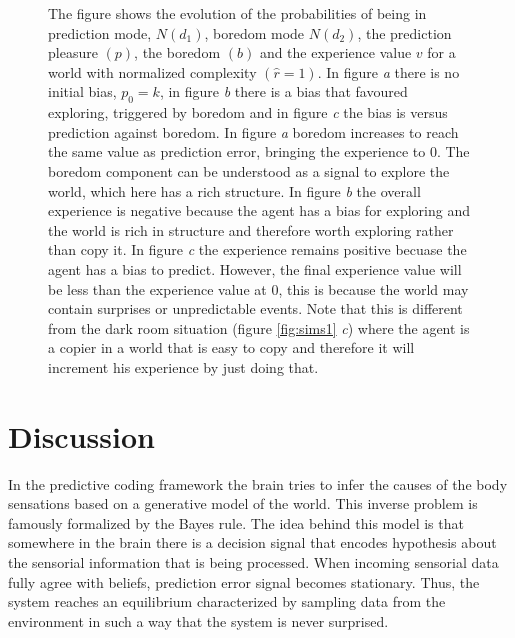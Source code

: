 \documentclass[11pt, onecolumn]{article}
\begin{document}
\begin{figure}[H]
    \hfill
    \hfill
    \caption{
The figure shows the evolution of the probabilities of being in prediction mode, $N(d_1)$, boredom mode $N(d_2)$, the prediction pleasure $(p)$, the boredom $(b)$ and the experience value $v$ for a world with normalized complexity $(\hat{r} = 1)$. 
In figure \emph{a} there is no initial bias, $p_0 = k$, in figure \emph{b} there is a bias that favoured exploring, triggered by boredom and in figure \emph{c} the bias is versus prediction against boredom. In figure  \emph{a} boredom increases to reach the same value as prediction error, bringing the experience to 0. The boredom component can be understood as a signal to explore the world, which here has a rich structure. In figure \emph{b} the overall experience is negative because the agent has a bias for exploring and the world is rich in structure and therefore worth exploring rather than copy it. In figure \emph{c} the experience remains positive becuase the agent has a bias to predict. However, the final experience value will be less than the experience value at 0, this is because the world may contain surprises or unpredictable events. Note that this is different from the dark room situation (figure \ref{fig:sims1} \emph{c}) where the agent is a copier in a world that is easy to copy and therefore it will increment his experience by just doing that.}
    \label{fig:sims2}
\end{figure}


\section{Discussion}
\label{se:dis}

In the predictive coding framework the brain tries to infer the causes of the body sensations based on a generative model of the world. This inverse problem is famously formalized by the Bayes rule. The idea behind this model is that somewhere in the brain there is a decision signal that encodes hypothesis about the sensorial information that is being processed. When incoming sensorial data fully agree with beliefs, prediction error signal becomes stationary. Thus, the system reaches an equilibrium characterized by sampling data from the environment in such a way that the system is never surprised.   
\end{document}
